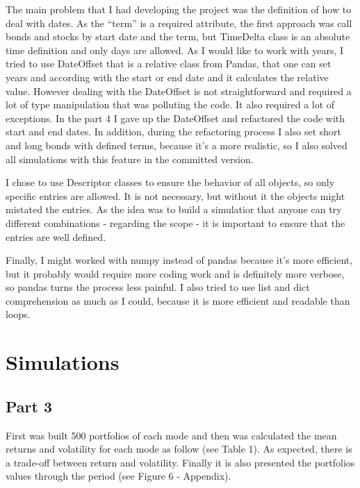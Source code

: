 \documentclass[
  11pt,
]{article}
\begin{document}
The main problem that I had developing the project was the definition of how to deal with dates. As the ``term'' is a required attribute, the first approach was call bonds and stocks by start date and the term, but TimeDelta class is an absolute time definition and only days are allowed. As I would like to work with years, I tried to use DateOffset that is a relative class from Pandas, that one can set years and according with the start or end date and it calculates the relative value. However dealing with the DateOffset is not straightforward and required a lot of type manipulation that was polluting the code. It also required a lot of exceptions. In the part 4 I gave up the DateOffset and refactored the code with start and end dates. In addition, during the refactoring process I also set short and long bonds with defined terms, because it's a more realistic, so I also solved all simulations with this feature in the committed version.

I chose to use Descriptor classes to ensure the behavior of all objects, so only specific entries are allowed. It is not necessary, but without it the objects might mistated the entries. As the idea was to build a simulatior that anyone can try different combinations - regarding the scope - it is important to ensure that the entries are well defined.

Finally, I might worked with numpy instead of pandas because it's more efficient, but it probably would require more coding work and is definitely more verbose, so pandas turns the process less painful. I also tried to use list and dict comprehension as much as I could, because it is more efficient and readable than loops.

\hypertarget{simulations}{%
\section{Simulations}\label{simulations}}

\hypertarget{part-3}{%
\subsection{Part 3}\label{part-3}}

First was built 500 portfolios of each mode and then was calculated the mean returns and volatility for each mode as follow (see Table 1). As expected, there is a trade-off between return and volatility. Finally it is also presented the portfolios values through the period (see Figure 6 - Appendix).
\end{document}
